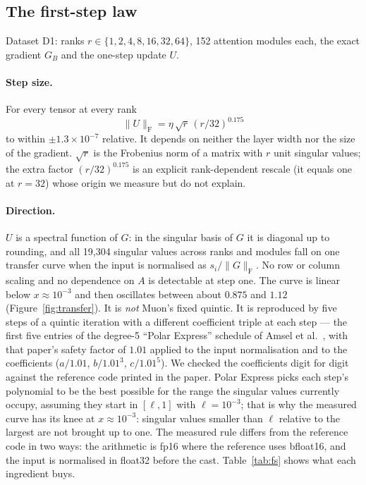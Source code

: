 \documentclass[11pt]{article}
\newcommand{\fro}{\mathrm{F}}
\begin{document}
\subsection{The first-step law}\label{sec:firststep}
Dataset D1: ranks $r\in\{1,2,4,8,16,32,64\}$, 152 attention modules each, the exact gradient $G_B$
and the one-step update $U$.

\paragraph{Step size.} For every tensor at every rank
\[
\|U\|_\fro=\eta\,\sqrt{r}\,(r/32)^{0.175}
\]
to within $\pm1.3\times10^{-7}$ relative. It depends on neither the layer width nor the size of the
gradient. $\sqrt r$ is the Frobenius norm of a matrix with $r$ unit singular values; the extra
factor $(r/32)^{0.175}$ is an explicit rank-dependent rescale (it equals one at $r=32$) whose
origin we measure but do not explain.

\paragraph{Direction.} $U$ is a spectral function of $G$: in the singular basis of $G$ it is
diagonal up to rounding, and all 19{,}304 singular values across ranks and modules fall on one
transfer curve when the input is normalised as $s_i/\|G\|_\fro$. No row or column scaling and no
dependence on $A$ is detectable at step one. The curve is linear below $x\approx10^{-3}$ and then
oscillates between about $0.875$ and $1.12$ (Figure~\ref{fig:transfer}). It is \emph{not} Muon's
fixed quintic. It is reproduced by five steps of a quintic iteration with a different coefficient
triple at each step --- the first five entries of the degree-5 ``Polar Express'' schedule of Amsel et
al.~\cite{amsel2025polar}, with that paper's safety factor of $1.01$ applied to the input
normalisation and to the coefficients ($a/1.01$, $b/1.01^3$, $c/1.01^5$). We checked the
coefficients digit for digit against the reference code printed in the paper. Polar Express picks
each step's polynomial to be the best possible for the range the singular values currently occupy,
assuming they start in $[\ell,1]$ with $\ell=10^{-3}$; that is why the measured curve has its knee
at $x\approx10^{-3}$: singular values smaller than $\ell$ relative to the largest are not brought up
to one. The measured rule differs from the reference code in two ways: the arithmetic is fp16 where
the reference uses bfloat16, and the input is normalised in float32 before the cast. Table~\ref{tab:fs} shows what each ingredient buys.
\end{document}
